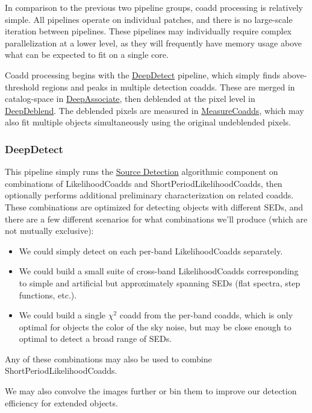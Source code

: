 In comparison to the previous two pipeline groups, coadd processing is relatively simple.  All pipelines operate on individual patches, and there is no large-scale iteration between pipelines.  These pipelines may individually require complex parallelization at a lower level, as they will frequently have memory usage above what can be expected to fit on a single core.

Coadd processing begins with the \hyperref[sec:drpDeepDetect]{DeepDetect} pipeline, which simply finds above-threshold regions and peaks in multiple detection coadds.  These are merged in catalog-space in \hyperref[sec:drpDeepAssociate]{DeepAssociate}, then deblended at the pixel level in \hyperref[sec:drpDeepDeblend]{DeepDeblend}.  The deblended pixels are measured in \hyperref[sec:drpMeasureCoadds]{MeasureCoadds}, which may also fit multiple objects simultaneously using the original undeblended pixels.

\subsubsection{DeepDetect}
\label{sec:drpDeepDetect}

This pipeline simply runs the \hyperref[sec:acSourceDetection]{Source Detection} algorithmic component on combinations of LikelihoodCoadds and ShortPeriodLikelihoodCoadds, then optionally performs additional preliminary characterization on related coadds.  These combinations are optimized for detecting objects with different SEDs, and there are a few different scenarios for what combinations we'll produce (which are not mutually exclusive):
\begin{itemize}
\item We could simply detect on each per-band LikelihoodCoadds separately.
\item We could build a small suite of cross-band LikelihoodCoadds corresponding to simple and artificial but approximately spanning SEDs (flat spectra, step functions, etc.).
\item We could build a single $\chi^2$ coadd from the per-band coadds, which is only optimal for objects the color of the sky noise, but may be close enough to optimal to detect a broad range of SEDs.
\end{itemize}
Any of these combinations may also be used to combine ShortPeriodLikelihoodCoadds.

We may also convolve the images further or bin them to improve our detection efficiency for extended objects.

